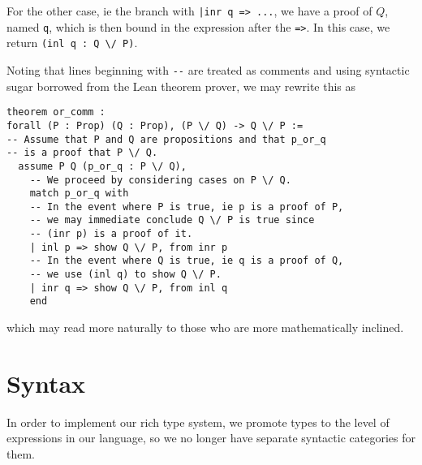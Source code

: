 \documentclass{article}
\begin{document}
For the other case, ie the branch with \verb#|inr q => ...#, we have a proof of
$Q$, named \verb|q|, which is then bound in the expression after the \verb|=>|.
In this case, we return \verb|(inl q : Q \/ P)|.

Noting that lines beginning with \verb|--| are treated as comments and 
using syntactic sugar borrowed from the Lean theorem prover, we may rewrite this
as
\begin{verbatim}
theorem or_comm :
forall (P : Prop) (Q : Prop), (P \/ Q) -> Q \/ P :=
-- Assume that P and Q are propositions and that p_or_q 
-- is a proof that P \/ Q.
  assume P Q (p_or_q : P \/ Q),
    -- We proceed by considering cases on P \/ Q.
    match p_or_q with
    -- In the event where P is true, ie p is a proof of P,
    -- we may immediate conclude Q \/ P is true since 
    -- (inr p) is a proof of it.
    | inl p => show Q \/ P, from inr p
    -- In the event where Q is true, ie q is a proof of Q,
    -- we use (inl q) to show Q \/ P. 
    | inr q => show Q \/ P, from inl q
    end
\end{verbatim}
which may read more naturally to those who are more mathematically inclined.




\section{Syntax}

In order to implement our rich type system, we promote types to the level of
expressions in our language, so we no longer have separate syntactic categories 
for them.
\end{document}
